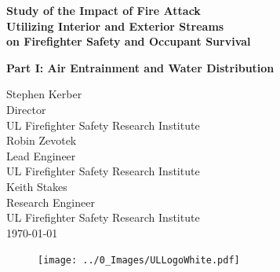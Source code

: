 \documentclass{article}
\begin{document}
	
	\begin{titlepage}
		
		\pagecolor{ULred}\afterpage{\nopagecolor}
		


			\vspace*{20\baselineskip} 

		\huge
		\begin{adjustwidth}{-0.5in}{-0in}
		\color{white}
		\textbf{Study of the Impact of Fire Attack \\ Utilizing Interior and Exterior Streams \\ on Firefighter Safety and Occupant Survival}
		\end{adjustwidth}
		\huge
		\begin{adjustwidth}{-0.5in}{-0in}
		\color{white}
		\textbf{Part I: Air Entrainment and Water Distribution}
		\end{adjustwidth}
		\begin{adjustwidth}{-0.5in}{}
		\color{white}
		\vspace{.2\baselineskip}
		\large
		Stephen Kerber \\
		Director \\
		UL Firefighter Safety Research Institute \\
		\vspace*{.5\baselineskip}
		Robin Zevotek \\
		Lead Engineer \\
		UL Firefighter Safety Research Institute \\ 
		\vspace*{.5\baselineskip}
		Keith Stakes \\
		Research Engineer \\
		UL Firefighter Safety Research Institute \\
		\vspace*{.8\baselineskip}	
		\today
		\vspace*{.8\baselineskip}
		\begin{figure}[h]
			\hspace*{-0.5in}\texttt{[image: ../0\_Images/ULLogoWhite.pdf]}
		\end{figure}
		\end{adjustwidth}
	\end{titlepage}
\end{document}
